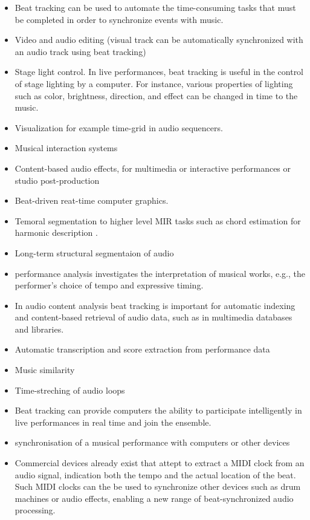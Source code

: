 \documentclass{scrartcl}
\begin{document}
\begin{itemize}
\item Beat tracking can be used to automate the time-consuming tasks that must be completed in order to synchronize events with music. 
\item Video and audio editing (visual track can be automatically synchronized with an audio track using beat tracking)
\item Stage light control. In live performances, beat tracking is useful in the control of stage lighting by a computer. For instance, various properties of lighting such as color, brightness, direction, and effect can be changed in time to the music.
\item Visualization for example time-grid in audio sequencers.
\item Musical interaction systems \cite{Robertson2007}
\item Content-based audio effects, for multimedia or interactive performances or studio post-production
\item Beat-driven reat-time computer graphics.
\item Temoral segmentation to higher level MIR tasks such as chord estimation for harmonic description \cite{Bello2005b}.
\item Long-term structural segmentaion of audio \cite{Bartsch2005}
\item performance analysis investigates the interpretation of musical works, e.g., the performer's choice of tempo and expressive timing. 
\item In audio content analysis beat tracking is important for automatic indexing and content-based retrieval of audio data, such as in multimedia databases and libraries.
\item Automatic transcription and score extraction from performance data 
\item Music similarity
\item Time-streching of audio loops
\item Beat tracking can provide computers the ability to participate intelligently in live performances in real time and join the ensemble.
\item synchronisation of a musical performance with computers or other devices
\item Commercial devices already exist that attept to extract a MIDI clock from an audio signal, indication both the tempo and the actual location of the beat. Such MIDI clocks can the be used to synchronize other devices such as drum machines or audio effects, enabling a new range of beat-synchronized audio processing.

\end{itemize}
\end{document}
